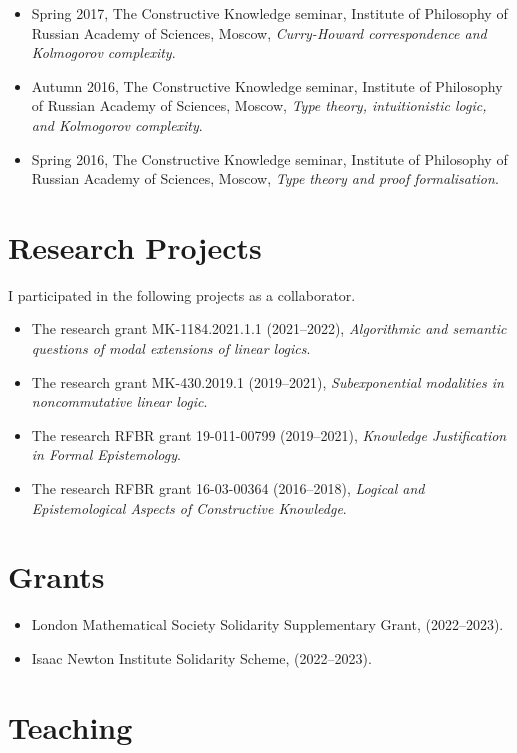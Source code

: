 \documentclass[11pt,a4paper]{article}
\begin{document}
\begin{itemize}[leftmargin=*]
    \item Spring 2017, The Constructive Knowledge seminar, Institute of Philosophy of Russian Academy of Sciences, Moscow, \textit{Curry-Howard correspondence and Kolmogorov complexity}.
    \item Autumn 2016, The Constructive Knowledge seminar, Institute of Philosophy of Russian Academy of Sciences, Moscow, \textit{Type theory, intuitionistic logic, and Kolmogorov complexity}.
    \item Spring 2016, The Constructive Knowledge seminar, Institute of Philosophy of Russian Academy of Sciences, Moscow, \textit{Type theory and proof formalisation}.
\end{itemize}

\section{Research Projects}

I participated in the following projects as a collaborator.
\begin{itemize}[leftmargin=*]
    \item The research grant MK-1184.2021.1.1 (2021--2022), \textit{Algorithmic and semantic questions of modal extensions of linear logics}.
    \item The research grant MK-430.2019.1 (2019--2021), \textit{Subexponential modalities in noncommutative linear logic}.
    \item The research RFBR grant 19-011-00799 (2019--2021), \textit{Knowledge Justification in Formal Epistemology}.
    \item The research RFBR grant 16-03-00364 (2016--2018), \textit{Logical and Epistemological Aspects of Constructive Knowledge}.
\end{itemize}

\section{Grants}

\begin{itemize}[leftmargin=*]
    \item London Mathematical Society Solidarity Supplementary Grant, (2022--2023).
    \item Isaac Newton Institute Solidarity Scheme, (2022--2023).
\end{itemize}

\section{Teaching}
\end{document}
